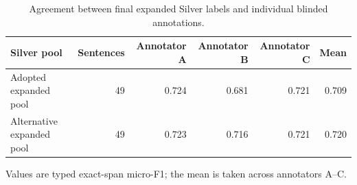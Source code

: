 \documentclass[fleqn,12pt]{wlpeerj}
\begin{document}
\setcounter{table}{15}
\begin{table}[!htbp]
\centering\small
\caption{Agreement between final expanded Silver labels and individual blinded annotations.}
\label{tab:silver-blinded}
\begin{tabularx}{\linewidth}{@{}Lrrrrr@{}}
\toprule
Silver pool & Sentences & Annotator A & Annotator B & Annotator C & Mean \\
\midrule
Adopted expanded pool & 49 & 0.724 & 0.681 & 0.721 & 0.709 \\
Alternative expanded pool & 49 & 0.723 & 0.716 & 0.721 & 0.720 \\
\bottomrule
\end{tabularx}
\par\smallskip\footnotesize\RaggedRight
Values are typed exact-span micro-F1; the mean is taken across annotators A--C.
\end{table}

\end{document}
